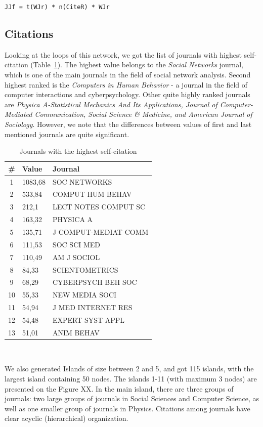 \documentclass[11pt]{article} %
\begin{document}
\texttt{JJf = t(WJr) * n(CiteR) * WJr}

\subsection{Citations}

Looking at the loops of this network, we got the list of journals with highest self-citation (Table~\ref{jselfcite}). The highest value belongs to the \textit{Social Networks} journal, which is one of the main journals in the field of social network analysis. Second highest ranked is the \textit{Computers in Human Behavior} - a journal in the field of computer interactions and cyberpsychology. Other quite highly ranked journals are \textit{Physica A-Statistical Mechanics And Its Applications, Journal of Computer-Mediated Communication, Social Science \& Medicine, and American Journal of Sociology}. However, we note that the differences between values of first and last mentioned journals are quite significant. \medskip 

\begin{table}
\caption{Journals with the highest self-citation} \label{jselfcite}\medskip
\renewcommand{\arraystretch}{0.95}
\small
\begin{center}
\begin{tabular}{c|l|l} 
\# &	Value&	Journal  \\  \hline 
1&	1083,68&	SOC NETWORKS\\
2&	533,84&	COMPUT HUM BEHAV \\
3&	212,1&	LECT NOTES COMPUT SC \\
4&	163,32&	PHYSICA A\\
5&	135,71&	J COMPUT-MEDIAT COMM\\
6&	111,53&	SOC SCI MED\\
7&	110,49&	AM J SOCIOL\\
8&	84,33&	SCIENTOMETRICS\\
9&	68,29&	CYBERPSYCH BEH SOC \\
10&	55,33&	NEW MEDIA SOCI\\
11&	54,94&	J MED INTERNET RES\\
12&	54,48&	EXPERT SYST APPL\\
13&	51,01&	ANIM BEHAV\\ \hline 
\end{tabular} \\ 
\end{center}
\end{table}  

We also generated Islands of size between 2 and 5, and got 115 islands, with the largest island containing 50 nodes. The islands 1-11 (with maximum 3 nodes) are presented on the Figure XX. In the main island, there are three groups of journals: two large groups of journals in Social Sciences and Computer Science, as well as one smaller group of journals in Physics. Citations among journals have clear acyclic (hierarchical) organization. \medskip 
\end{document}
